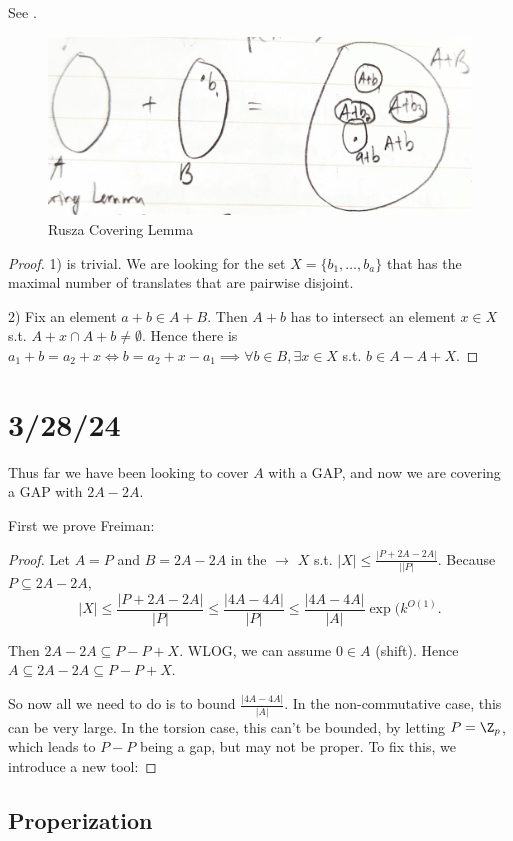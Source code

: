 \documentclass[a4paper]{article}
\begin{document}
See .

\begin{figure}[ht]
	\centering
	\includegraphics[width=.5\textwidth]{Rusza_covering}
	\caption{Rusza Covering Lemma \label{fig:Rusza_covering}}
\end{figure}

\begin{proof}
	1) is trivial.
	We are looking for the set $X = \{b_{1},\ldots, b_a\}$ that has the maximal number of translates that are pairwise disjoint.

	2) Fix an element $a+b \in A+ B $.
	Then $A + b $ has to intersect an element $x \in X $ s.t. $A+x \cap A+b \ne \emptyset $.
	Hence there is $a_{1} + b = a_{2} + x \iff b = a_{2}+x-a_{1} \implies \forall b \in B, \exists x \in X$ s.t. $b \in A - A + X$.
\end{proof}

\section{3/28/24}

Thus far we have been looking to cover $A $ with a GAP, and now we are covering a GAP with $2A-2A $.

First we prove Freiman:

\begin{proof}
	Let $A = P $ and $B = 2A-2A $ in the  $\rightarrow $ $X $ s.t. $|X| \le \frac{|P+2A-2A|}{||P|} $.
	Because $P\subseteq 2A-2A $,
	\[
		|X| \le \frac{|P+2A-2A|}{|P|} \le \frac{|4A-4A|}{|P|} \le \frac{|4A-4A|}{|A|}\exp(k^{O(1)}
	.\]

	Then $2A-2A \subseteq P -P + X $.
	WLOG, we can assume $0\in A $ (shift).
	Hence $A\subseteq 2A-2A \subseteq P - P +X $.

	So now all we need to do is to bound $\frac{|4A-4A|}{|A|} $.
	In the non-commutative case, this can be very large.
	In the torsion case, this can't be bounded, by letting $P = \Z_p $, which leads to $P-P $ being a gap, but may not be proper.
	To fix this, we introduce a new tool:
\end{proof}

\subsection{Properization}
\end{document}
